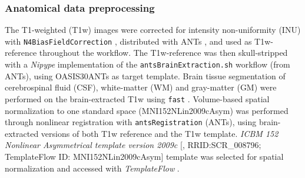 \documentclass[fleqn,10pt]{wlscirep}
\begin{document}
\subsubsection*{Anatomical data preprocessing}
The T1-weighted (T1w) images were corrected for intensity non-uniformity (INU) with \texttt{N4BiasFieldCorrection} \citep{n4},
distributed with ANTs \citep[RRID:SCR\_004757]{ants},
and used as T1w-reference throughout the workflow. The T1w-reference was
then skull-stripped with a \emph{Nipype} implementation of the
\texttt{antsBrainExtraction.sh} workflow (from ANTs), using OASIS30ANTs
as target template. Brain tissue segmentation of cerebrospinal fluid
(CSF), white-matter (WM) and gray-matter (GM) were performed on the
brain-extracted T1w using \texttt{fast} \citep[FSL,
RRID:SCR\_002823,][]{fsl_fast}. Volume-based spatial normalization to
one standard space (MNI152NLin2009cAsym) was performed through nonlinear
registration with \texttt{antsRegistration} (ANTs),
using brain-extracted versions of both T1w reference and the T1w
template. \emph{ICBM 152 Nonlinear Asymmetrical
template version 2009c} {[}\citet{mni152nlin2009casym},
RRID:SCR\_008796; TemplateFlow ID: MNI152NLin2009cAsym{]} template was selected for spatial
normalization and accessed with \emph{TemplateFlow}
\citep[23.0.0,][]{ciric2022templateflow}.
\end{document}
